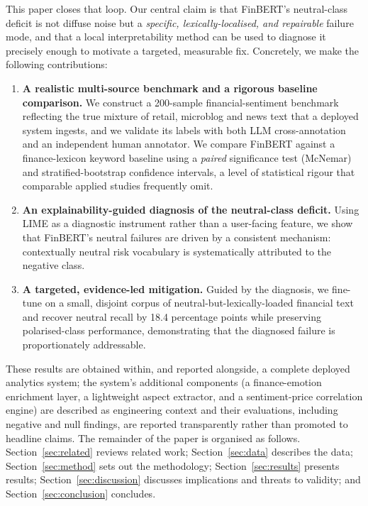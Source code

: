\documentclass[12pt,a4paper]{article}
\begin{document}
This paper closes that loop. Our central claim is that FinBERT's neutral-class
deficit is not diffuse noise but a \emph{specific, lexically-localised, and
repairable} failure mode, and that a local interpretability method can be used to
diagnose it precisely enough to motivate a targeted, measurable fix. Concretely,
we make the following contributions:
\begin{enumerate}
\item \textbf{A realistic multi-source benchmark and a rigorous baseline
comparison.} We construct a 200-sample financial-sentiment benchmark reflecting
the true mixture of retail, microblog and news text that a deployed system
ingests, and we validate its labels with both LLM cross-annotation and an
independent human annotator. We compare FinBERT against a finance-lexicon keyword
baseline using a \emph{paired} significance test (McNemar) and stratified-bootstrap
confidence intervals, a level of statistical rigour that comparable applied studies
frequently omit.
\item \textbf{An explainability-guided diagnosis of the neutral-class deficit.}
Using LIME as a diagnostic instrument rather than a user-facing feature, we show
that FinBERT's neutral failures are driven by a consistent mechanism: contextually
neutral risk vocabulary is systematically attributed to the negative class.
\item \textbf{A targeted, evidence-led mitigation.} Guided by the diagnosis, we
fine-tune on a small, disjoint corpus of neutral-but-lexically-loaded financial
text and recover neutral recall by 18.4 percentage points while preserving
polarised-class performance, demonstrating that the diagnosed failure is
proportionately addressable.
\end{enumerate}

These results are obtained within, and reported alongside, a complete deployed
analytics system; the system's additional components (a finance-emotion enrichment
layer, a lightweight aspect extractor, and a sentiment-price correlation engine)
are described as engineering context and their evaluations, including negative and
null findings, are reported transparently rather than promoted to headline claims.
The remainder of the paper is organised as follows. Section~\ref{sec:related}
reviews related work; Section~\ref{sec:data} describes the data;
Section~\ref{sec:method} sets out the methodology; Section~\ref{sec:results}
presents results; Section~\ref{sec:discussion} discusses implications and threats
to validity; and Section~\ref{sec:conclusion} concludes.
\end{document}
